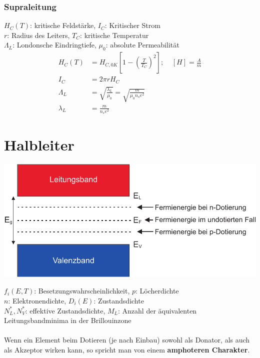 \documentclass[a4paper,twocolumn,10pt]{article}
\begin{document}
\subsubsection{Supraleitung}
$H_C(T)$: kritische Feldstärke, $I_C$: Kritischer Strom\\
$r$: Radius des Leiters, $T_C$: kritische Temperatur\\
$\Lambda_L$: Londonsche Eindringtiefe, $\mu_0$: absolute Permeabilität
\begin{equation*}
\begin{split}
H_C(T)&=H_{C,0K}\left[1-\left(\frac{T}{T_C}\right)^2\right];\;\;\;\;[H]=\frac{A}{m}\\
I_C&=2\pi rH_C\\
\Lambda_L&=\sqrt{\frac{\lambda_L}{\mu_0}}=\sqrt{\frac{m}{\mu_0n_se^2}}\\
\lambda_L&=\frac{m}{n_se^2}
\end{split}
\end{equation*}

\section{Halbleiter}
\begin{center}
\includegraphics[width=0.95\columnwidth]{Grafiken/Halbleiter_Band}
\end{center}
$f_i(E,T)$: Besetzungswahrscheinlichkeit, $p$: Löcherdichte\\
$n$: Elektronendichte, $D_i(E)$: Zustandsdichte\\
$N_L^*,N_V^*$: effektive Zustandsdichte, $M_L$: Anzahl der äquivalenten Leitungsbandminima in der Brillouinzone\\\\
Wenn ein Element beim Dotieren (je nach Einbau) sowohl als Donator, als auch als Akzeptor wirken kann, so spricht man von einem \textbf{amphoteren Charakter}.
\end{document}
